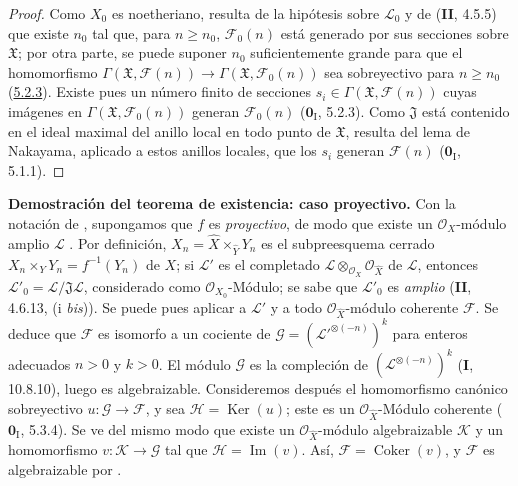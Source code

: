 \begin{proof}
Como $X_0$ es noetheriano, resulta de la hipótesis sobre $\mathcal L_0$ y de
(\textbf{II}, 4.5.5) que existe $n_0$ tal que, para $n\geq n_0$, $\mathcal F_0(n)$ está
generado por sus secciones sobre $\mathfrak X$; por otra parte, se puede suponer
$n_0$ suficientemente grande para que el homomorfismo
$\Gamma(\mathfrak X,\mathcal F(n))\longrightarrow
\Gamma(\mathfrak X,\mathcal F_0(n))$
sea sobreyectivo para $n\geq n_0$ (\hyperref[III.5.2.3-fr]{5.2.3}). Existe pues
un número finito de secciones $s_i\in\Gamma(\mathfrak X,\mathcal F(n))$ cuyas
imágenes en $\Gamma(\mathfrak X,\mathcal F_0(n))$ generan $\mathcal F_0(n)$
($\mathbf{0}_{\mathrm I}$, 5.2.3). Como $\mathfrak J$ está contenido en el ideal maximal del
anillo local en todo punto de $\mathfrak X$, resulta del lema de Nakayama,
aplicado a estos anillos locales, que los $s_i$ generan $\mathcal F(n)$
($\mathbf{0}_{\mathrm I}$, 5.1.1).
\end{proof}

\begin{env}[5.2.5]
\label{III.5.2.5}
\label{III.5.2.5-fr}
\textbf{Demostración del teorema de existencia: caso proyectivo.}
Con la notación de , supongamos que $f$ es
\emph{proyectivo}, de modo que existe un $\mathcal O_X$-módulo amplio $\mathcal L$
. Por definición,
$X_n=\widehat X\times_{\widehat Y}Y_n$
es el subpreesquema cerrado
$X_n\times_Y Y_n=f^{-1}(Y_n)$ de $X$; si
$\mathcal L'$ es el
completado $\mathcal L\otimes_{\mathcal O_X}\mathcal O_{\widehat X}$ de $\mathcal L$, entonces
$\mathcal L'_0=\mathcal L/\mathfrak J\mathcal L$, considerado como
$\mathcal O_{X_0}$-Módulo; se sabe que $\mathcal L'_0$ es \emph{amplio}
(\textbf{II}, 4.6.13, (i \emph{bis})). Se puede pues aplicar a $\mathcal L'$ y a todo
$\mathcal O_{\widehat X}$-módulo coherente $\mathcal F$. Se deduce que
$\mathcal F$ es isomorfo a un cociente de
$\mathcal G=(\mathcal L'^{\otimes(-n)})^k$
para enteros adecuados $n>0$ y $k>0$. El módulo $\mathcal G$ es la
compleción de $(\mathcal L^{\otimes(-n)})^k$ (\textbf{I}, 10.8.10), luego es algebraizable. Consideremos después el homomorfismo canónico sobreyectivo $u:\mathcal G\to\mathcal F$, y sea $\mathcal H=\operatorname{Ker}(u)$; este es un
$\mathcal O_{\widehat X}$-Módulo coherente ($\mathbf{0}_{\mathrm I}$, 5.3.4). Se ve del
mismo modo que existe un $\mathcal O_{\widehat X}$-módulo algebraizable $\mathcal K$ y un homomorfismo
$v:\mathcal K\to\mathcal G$ tal que $\mathcal H=\operatorname{Im}(v)$. Así,
$\mathcal F=\operatorname{Coker}(v)$, y $\mathcal F$ es algebraizable por
.
\end{env}

